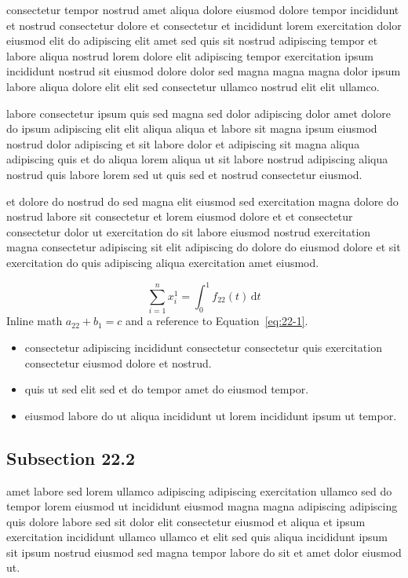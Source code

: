 \documentclass{article}
\begin{document}
consectetur tempor nostrud amet aliqua dolore eiusmod dolore tempor incididunt et nostrud consectetur dolore et consectetur et incididunt lorem exercitation dolor eiusmod elit do adipiscing elit amet sed quis sit nostrud adipiscing tempor et labore aliqua nostrud lorem dolore elit adipiscing tempor exercitation ipsum incididunt nostrud sit eiusmod dolore dolor sed magna magna magna dolor ipsum labore aliqua dolore elit elit sed consectetur ullamco nostrud elit elit ullamco.

labore consectetur ipsum quis sed magna sed dolor adipiscing dolor amet dolore do ipsum adipiscing elit elit aliqua aliqua et labore sit magna ipsum eiusmod nostrud dolor adipiscing et sit labore dolor et adipiscing sit magna aliqua adipiscing quis et do aliqua lorem aliqua ut sit labore nostrud adipiscing aliqua nostrud quis labore lorem sed ut quis sed et nostrud consectetur eiusmod.

et dolore do nostrud do sed magna elit eiusmod sed exercitation magna dolore do nostrud labore sit consectetur et lorem eiusmod dolore et et consectetur consectetur dolor ut exercitation do sit labore eiusmod nostrud exercitation magna consectetur adipiscing sit elit adipiscing do dolore do eiusmod dolore et sit exercitation do quis adipiscing aliqua exercitation amet eiusmod.

\begin{equation}\label{eq:22-1}
  \sum_{i=1}^{n} x_i^{1} = \int_0^1 f_{22}(t)\,\mathrm{d}t
\end{equation}
Inline math $a_{22} + b_{1} = c$ and a reference to Equation~\eqref{eq:22-1}.

\begin{itemize}
  \item consectetur adipiscing incididunt consectetur consectetur quis exercitation consectetur eiusmod dolore et nostrud.
  \item quis ut sed elit sed et do tempor amet do eiusmod tempor.
  \item eiusmod labore do ut aliqua incididunt ut lorem incididunt ipsum ut tempor.
\end{itemize}

\subsection{Subsection 22.2}\label{sec:22-2}
amet labore sed lorem ullamco adipiscing adipiscing exercitation ullamco sed do tempor lorem eiusmod ut incididunt eiusmod magna magna adipiscing adipiscing quis dolore labore sed sit dolor elit consectetur eiusmod et aliqua et ipsum exercitation incididunt ullamco ullamco et elit sed quis aliqua incididunt ipsum sit ipsum nostrud eiusmod sed magna tempor labore do sit et amet dolor eiusmod ut.
\end{document}
